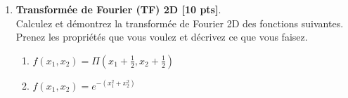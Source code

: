 \documentclass{article}
\begin{document}
\begin{enumerate}
\item {\bf Transformée de Fourier (TF) 2D [10 pts]}. \\
  Calculez et démontrez la
  transformée de Fourier 2D des 
  fonctions suivantes. Prenez les propriétés que vous voulez et
  décrivez ce que vous faisez.  
  \vspace{1cm}    
  \begin{enumerate}
  \item  %
    $f(x_1, x_2) = \Pi( x_1 + \frac{1}{2}, x_2 + \frac{1}{2})$ 
    
    \vspace{1cm}    
  \item $f(x_1, x_2) = e^{-(x_1^2 + x_2^2)}$
  \end{enumerate}
  \vspace{1cm}  


\end{enumerate}
\end{document}
